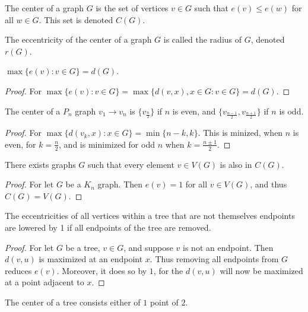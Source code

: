     \begin{definition}
    The center of a graph $G$ is the set of vertices $v\in G$ such that $e(v) \leq e(w)$ for all $w\in G$. This set is denoted $C(G)$.
    \end{definition}
    \begin{definition}
    The eccentricity of the center of a graph $G$ is called the radius of $G$, denoted $r(G)$.
    \end{definition}
    \begin{theorem}
    $\max\{e(v):v\in G\}= d(G)$.
    \end{theorem}
    \begin{proof}
    For $\max\{e(v):v\in G\} = \max\{d(v,x), x\in G:v\in G\} = d(G)$.
    \end{proof}
    \begin{theorem}
    The center of a $P_n$ graph $v_1\rightarrow v_n$ is $\{v_\frac{n}{2}\}$ if $n$ is even, and $\{v_{\frac{n-1}{2}},v_{\frac{n+1}{2}}\}$ if $n$ is odd.
    \end{theorem}
    \begin{proof}
    For $\max\{d(v_k,x):x\in G\} = \min\{n-k,k\}$. This is minized, when $n$ is even, for $k= \frac{n}{2}$, and is minimized for odd $n$ when $k=\frac{n\pm 1}{2}$.
    \end{proof}
    \begin{theorem}
    There exists graphs $G$ such that every element $v\in V(G)$ is also in $C(G)$.
    \end{theorem}
    \begin{proof}
    For let $G$ be a $K_n$ graph. Then $e(v) = 1$ for all $v\in V(G)$, and thus $C(G) = V(G)$.
    \end{proof}
    \begin{theorem}
    The eccentricities of all vertices within a tree that are not themselves endpoints are lowered by 1 if all endpoints of the tree are removed.
    \end{theorem}
    \begin{proof}
    For let $G$ be a tree, $v\in G$, and suppose $v$ is not an endpoint. Then $d(v,u)$ is maximized at an endpoint $x$. Thus removing all endpoints from $G$ reduces $e(v)$. Moreover, it does so by $1$, for the $d(v,u)$ will now be maximized at a point adjacent to $x$.
    \end{proof}
    \begin{theorem}
    The center of a tree consists either of $1$ point of $2$.
    \end{theorem}
